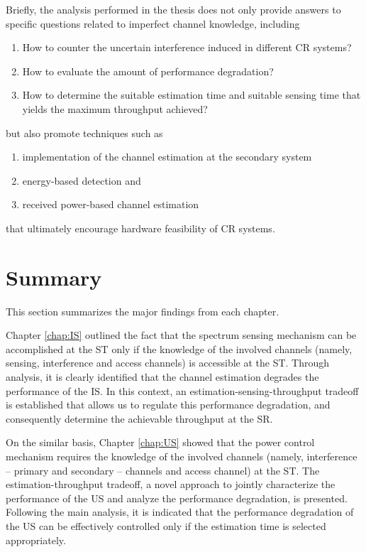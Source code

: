 Briefly, the analysis performed in the thesis does not only provide answers to specific questions related to imperfect channel knowledge, including 
\begin{enumerate} \item How to counter the uncertain interference induced in different CR systems? \item How to evaluate the amount of performance degradation? \item How to determine the suitable estimation time and suitable sensing time that yields the maximum throughput achieved? \end{enumerate}
but also promote techniques such as \begin{enumerate} \item implementation of the channel estimation at the secondary system \item energy-based detection and \item received power-based channel estimation \end{enumerate} that ultimately encourage hardware feasibility of CR systems. 


\section{Summary}
This section summarizes the major findings from each chapter. 

Chapter \ref{chap:IS} outlined the fact that the spectrum sensing mechanism can be accomplished at the ST only if the knowledge of the involved channels (namely, sensing, interference and access channels) is accessible at the ST. Through analysis, it is clearly identified that the channel estimation degrades the performance of the IS. In this context, an estimation-sensing-throughput tradeoff is established that allows us to regulate this performance degradation, and consequently determine the achievable throughput at the SR.

On the similar basis, Chapter \ref{chap:US} showed that the power control mechanism requires the knowledge of the involved channels (namely, interference -- primary and secondary -- channels and access channel) at the ST. The estimation-throughput tradeoff, a novel approach to jointly characterize the performance of the US and analyze the performance degradation, is presented. Following the main analysis, it is indicated that the performance degradation of the US can be effectively controlled only if the estimation time is selected appropriately.   


